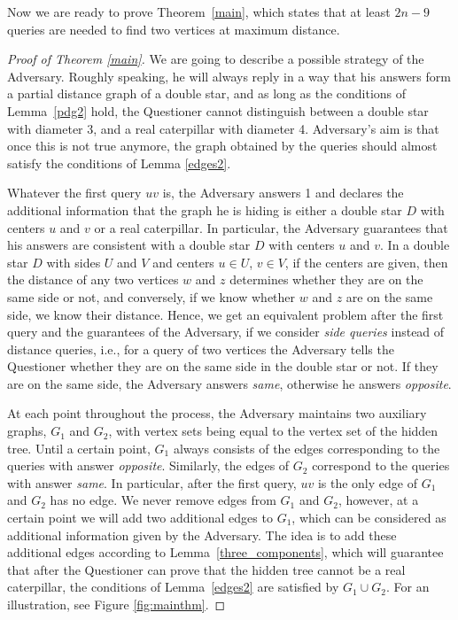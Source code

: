 \documentclass[12pt,a4paper]{amsart}
\theoremstyle{plain}
\theoremstyle{definition}
\newcommand{\opposite}{\textit{opposite}}
\newcommand{\same}{\textit{same}}
\begin{document}
Now we are ready to prove Theorem~\ref{main}, which states that at least $2n-9$ queries are needed to find two vertices at maximum distance.

\begin{proof}[Proof of Theorem \ref{main}]
    We are going to describe a possible strategy of the Adversary. Roughly speaking, he will always reply in a way that his answers form a partial distance graph of a double star, and as long as the conditions of Lemma~\ref{pdg2} hold, the Questioner cannot distinguish between a double star with diameter 3, and a real caterpillar with diameter 4. Adversary's aim is that once this is not true anymore, the graph obtained by the queries should almost satisfy the conditions of Lemma \ref{edges2}. 

    Whatever the first query $uv$ is, the Adversary answers 1 and declares the additional information that the graph he is hiding is either a double star $D$ with centers $u$ and $v$ or a real caterpillar. In particular, the Adversary guarantees that his answers are consistent with a double star $D$ with centers $u$ and $v$. In a double star $D$ with sides $U$ and $V$ and centers $u \in U$, $v \in V$, if the centers are given, then the distance of any two vertices $w$ and $z$ determines whether they are on the same side or not, and conversely, if we know whether $w$ and $z$ are on the same side, we know their distance. Hence, we get an equivalent problem after the first query and the guarantees of the Adversary, if we consider \emph{side queries} instead of distance queries, i.e., for a query of two vertices the Adversary tells the Questioner whether they are on the same side in the double star or not. If they are on the same side, the Adversary answers \emph{same}, otherwise he answers \emph{opposite}.
    
    At each point throughout the process, the Adversary maintains two auxiliary graphs, $G_1$ and $G_2$, with vertex sets being equal to the vertex set of the hidden tree. Until a certain point, $G_1$ always consists of the edges corresponding to the queries with answer \opposite.
    Similarly, the edges of $G_2$ correspond to the queries with answer \same. In particular, after the first query, $uv$ is the only edge of $G_1$ and $G_2$ has no edge. We never remove edges from $G_1$ and $G_2$, however, at a certain point we will add two additional edges to $G_1$, which can be considered as additional information given by the Adversary. The idea is to add these additional edges according to Lemma~\ref{three_components}, which will guarantee that after the Questioner can prove that the hidden tree cannot be a real caterpillar, the conditions of Lemma~\ref{edges2} are satisfied by $G_1 \cup G_2$. For an illustration, see Figure \ref{fig:mainthm}.


\end{proof}
\end{document}
